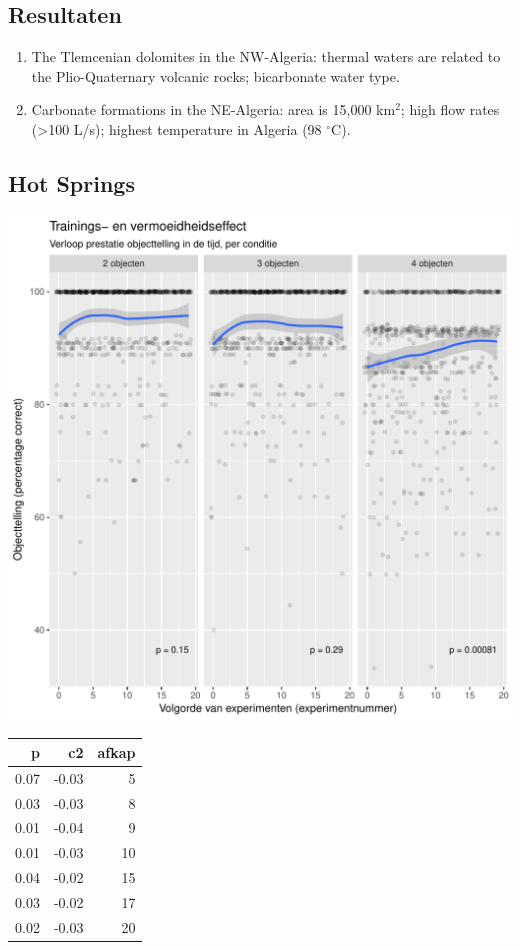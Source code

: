 \documentclass[a0,portrait]{a0poster}
\begin{document}
\begin{multicols}{3}

\subsection*{Resultaten}
\begin{enumerate}
\item The Tlemcenian dolomites in the NW-Algeria: thermal waters are related to the Plio-Quaternary volcanic rocks; bicarbonate water type.
\item Carbonate formations in the NE-Algeria: area is 15,000 km$^2$; high flow rates (\textgreater100 L/s); highest temperature in Algeria (98 $^{\circ}$C). 
\end{enumerate}

\subsection*{Hot Springs}
\begin{center}\vspace{1cm}
	\includegraphics[width=0.8\linewidth]{training-grid.pdf}
\end{center}\vspace{1cm}
\begin{center}
\begin{tabular}{r r r}
	\hline
	p & c2 & afkap\\
	\hline
	0.07 & -0.03 & 5\\
	0.03 & -0.03 & 8\\
	0.01 & -0.04 & 9\\
	0.01 & -0.03 & 10\\
	0.04 & -0.02 & 15\\
	0.03 & -0.02 & 17\\
	0.02 & -0.03 & 20\\
	\hline
\end{tabular}
\end{center}


\end{multicols}
\end{document}
